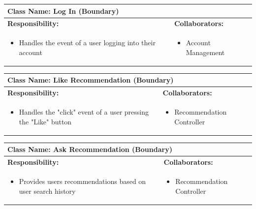 \documentclass[]{article}
\begin{document}
\begin{table}[H]
    \centering
    \begin{tabular}{|p{7cm}|p{7cm}|}
        \hline 
        \multicolumn{2}{|l|}{\textbf{Class Name:} Log In (Boundary)} \\
        \hline
        \textbf{Responsibility:} & \textbf{Collaborators:} \\
        \hline
        \raggedright
        \begin{itemize}
            \item Handles the event of a user logging into their account
        \end{itemize}
        \vspace{1in} &
        \begin{itemize}
            \item Account Management
        \end{itemize} \\
        \hline
    \end{tabular}
\end{table}


\begin{table}[H]
	\centering
	\begin{tabular}{|p{7cm}|p{7cm}|}
	\hline 
	 \multicolumn{2}{|l|}{\textbf{Class Name:} Like Recommendation (Boundary)} \\
	\hline
	\textbf{Responsibility:} & \textbf{Collaborators:} \\
	\hline
	\raggedright
	\begin{itemize}
		\item Handles the "click" event of a user pressing the "Like" button
	\end{itemize}
	\vspace{1in} & 
	\begin{itemize}
		\item Recommendation Controller
	\end{itemize} \\
	\hline
	\end{tabular}
\end{table}

\begin{table}[H]
	\centering
	\begin{tabular}{|p{7cm}|p{7cm}|}
	\hline 
	 \multicolumn{2}{|l|}{\textbf{Class Name:} Ask Recommendation (Boundary)} \\
	\hline
	\textbf{Responsibility:} & \textbf{Collaborators:} \\
	\hline
	\raggedright
	\begin{itemize}
		\item Provides users recommendations based on user search history
	\end{itemize}
	\vspace{1in} & 
	\begin{itemize}
		\item Recommendation Controller
	\end{itemize} \\
	\hline
	\end{tabular}
\end{table}
\end{document}
